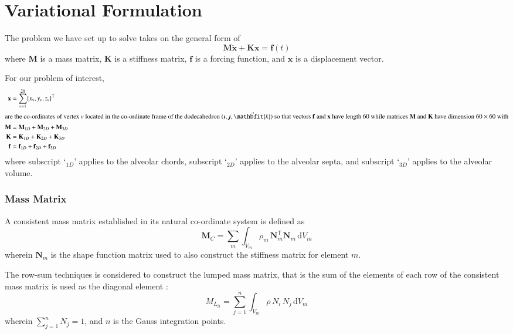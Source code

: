 \setcounter{section}{0}
\part{Variational Formulation}
\label{partVariational}

The problem we have set up to solve takes on the general form of 
\begin{equation}
	\mathbf{M} \ddot{\mathbf{x}} + \mathbf{K} \mathbf{x} = \mathbf{f}(t)
\end{equation}
where $\mathbf{M}$ is a mass matrix, $\mathbf{K}$ is a stiffness matrix, $\mathbf{f}$ is a forcing function, and $\mathbf{x}$ is a displacement vector.  

For our problem of interest, 
\begin{subequations}
\begin{align}
	\mathbf{x} & = \sum_{v=1}^{20} \{ x_v , y_v , z_v \}^{\mathsf{T}} \\
	\intertext{are the co-ordinates of vertex $v$ located in the co-ordinate frame of the dodecahedron $(\boldsymbol{\imath} , \boldsymbol{\jmath} , \vec{\mathbfit{k}} )$ so that vectors $\mathbf{f}$ and $\mathbf{x}$ have length 60 while matrices $\mathbf{M}$ and $\mathbf{K}$ have dimension $60 \times 60$ with}
	\mathbf{M} & = \mathbf{M}_{1D} + \mathbf{M}_{2D} + \mathbf{M}_{3D} \\
	\mathbf{K} & = \mathbf{K}_{1D} + \mathbf{K}_{2D} + \mathbf{K}_{3D} \\
	\mathbf{f} & = \mathbf{f}_{1D} + \mathbf{f}_{2D} + \mathbf{f}_{3D}
\end{align}
\end{subequations}
where subscript `$\mbox{}_{1D}$' applies to the alveolar chords, subscript `$\mbox{}_{2D}$' applies to the alveolar septa, and subscript `$\mbox{}_{3D}$' applies to the alveolar volume.

\section{Mass Matrix}
A consistent mass matrix \cite{Archer65} established in its natural co-ordinate system is defined as
\begin{equation}
	\mathbf{M}_{C} = \sum_m \int_{V_m} \rho_m \, \mathbf{N}_m^{\mathsf{T}} \mathbf{N}_m \,
	\mathrm{d} V_m
	\label{consistentMassMatrix}
\end{equation}
wherein $\mathbf{N}_m$ is the shape function matrix used to also construct the stiffness matrix for element $m$.

The row-sum techniques is considered to construct the lumped mass matrix, that is the sum of the elements of each row of the consistent mass matrix is used as the diagonal element \cite{Reddy93}:
\begin{equation}
{M}_{L_{ii}} = \sum_{j=1}^n \int_{V_m} \rho \, N_i \, N_j \, \mathrm{d}  V_m 
\end{equation}
wherein $\sum_{j=1}^n N_j = 1$, and $n$ is the Gauss integration points.

